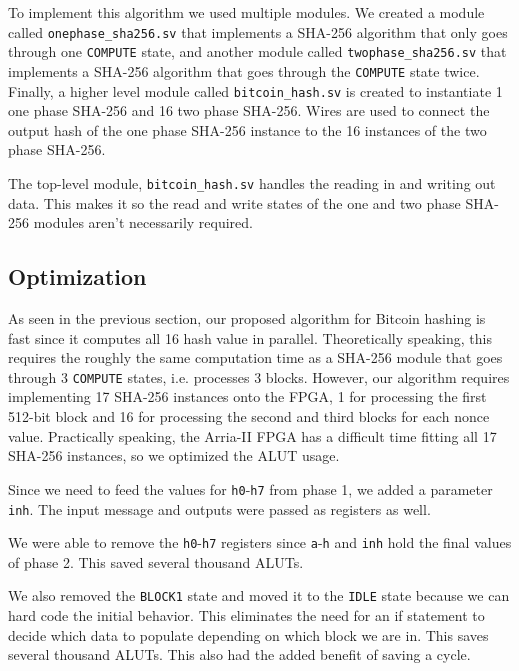 \documentclass{article}
\begin{document}
To implement this algorithm we used multiple modules. We created a module called \verb|onephase_sha256.sv| that implements a SHA-256 algorithm that only goes through one \verb|COMPUTE| state, and another module called \verb|twophase_sha256.sv| that implements a SHA-256 algorithm that goes through the \verb|COMPUTE| state twice. Finally, a higher level module called \verb|bitcoin_hash.sv| is created to instantiate 1 one phase SHA-256 and 16 two phase SHA-256. Wires are used to connect the output hash of the one phase SHA-256 instance to the 16 instances of the two phase SHA-256.

The top-level module, \verb|bitcoin_hash.sv| handles the reading in and writing out data. This makes it so the read and write states of the one and two phase SHA-256 modules aren't necessarily required.

\subsection{Optimization}

As seen in the previous section, our proposed algorithm for Bitcoin hashing is fast since it computes all 16 hash value in parallel. Theoretically speaking, this requires the roughly the same computation time as a SHA-256 module that goes through 3 \verb|COMPUTE| states, i.e. processes 3 blocks. However, our algorithm requires implementing 17 SHA-256 instances onto the FPGA, 1 for processing the first 512-bit block and 16 for processing the second and third blocks for each nonce value. Practically speaking, the Arria-II FPGA has a difficult time fitting all 17 SHA-256 instances, so we optimized the ALUT usage.

Since we need to feed the values for \verb|h0|-\verb|h7| from phase 1, we added a parameter \verb|inh|. The input message and outputs were passed as registers as well.



We were able to remove the \verb|h0|-\verb|h7| registers since \verb|a|-\verb|h| and \verb|inh| hold the final values of phase 2. This saved several thousand ALUTs.


We also removed the \verb|BLOCK1| state and moved it to the \verb|IDLE| state because we can hard code the initial behavior. This eliminates the need for an if statement to decide which data to populate depending on which block we are in. This saves several thousand ALUTs. This also had the added benefit of saving a cycle.

\end{document}
